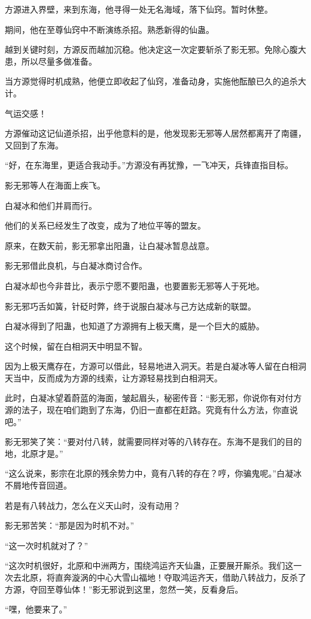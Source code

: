 \begin{this_body}
方源进入界壁，来到东海，他寻得一处无名海域，落下仙窍。暂时休整。

期间，他在至尊仙窍中不断演练杀招。熟悉新得的仙蛊。

越到关键时刻，方源反而越加沉稳。他决定这一次定要斩杀了影无邪。免除心腹大患，所以尽量多做准备。

当方源觉得时机成熟，他便立即收起了仙窍，准备动身，实施他酝酿已久的追杀大计。

气运交感！

方源催动这记仙道杀招，出乎他意料的是，他发现影无邪等人居然都离开了南疆，又回到了东海。

“好，在东海里，更适合我动手。”方源没有再犹豫，一飞冲天，兵锋直指目标。

影无邪等人在海面上疾飞。

白凝冰和他们并肩而行。

他们的关系已经发生了改变，成为了地位平等的盟友。

原来，在数天前，影无邪拿出阳蛊，让白凝冰暂息战意。

影无邪借此良机，与白凝冰商讨合作。

白凝冰却也今非昔比，表示宁愿不要阳蛊，也要置影无邪等人于死地。

影无邪巧舌如簧，针砭时弊，终于说服白凝冰与己方达成新的联盟。

白凝冰得到了阳蛊，也知道了方源拥有上极天鹰，是一个巨大的威胁。

这个时候，留在白相洞天中明显不智。

因为上极天鹰存在，方源可以借此，轻易地进入洞天。若是白凝冰等人留在白相洞天当中，反而成为方源的线索，让方源轻易找到白相洞天。

此时，白凝冰望着蔚蓝的海面，皱起眉头，秘密传音：“影无邪，你说你有对付方源的法子，现在咱们跑到了东海，仍旧一直都在赶路。究竟有什么方法，你直说吧。”

影无邪笑了笑：“要对付八转，就需要同样对等的八转存在。东海不是我们的目的地，北原才是。”

“这么说来，影宗在北原的残余势力中，竟有八转的存在？哼，你骗鬼呢。”白凝冰不屑地传音回道。

若是有八转战力，怎么在义天山时，没有动用？

影无邪苦笑：“那是因为时机不对。”

“这一次时机就对了？”

“这次时机很好，北原和中洲两方，围绕鸿运齐天仙蛊，正要展开厮杀。我们这一次去北原，将直奔漩涡的中心大雪山福地！夺取鸿运齐天，借助八转战力，反杀了方源，夺回至尊仙体！”影无邪说到这里，忽然一笑，反看身后。

“嘿，他要来了。”


\end{this_body}
